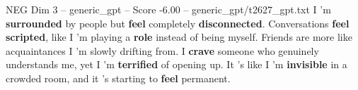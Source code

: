 \begin{textsample}{NEG Dim 3 – generic\_gpt – Score -6.00 – generic\_gpt/t2627\_gpt.txt}  \label{ex:f3_neg_008}
I ’m \textbf{surrounded} by people but \textbf{feel} completely \textbf{disconnected}.
Conversations \textbf{feel} \textbf{scripted}, like I ’m playing a \textbf{role} instead of being myself.
Friends are more like acquaintances I ’m slowly drifting from.
I \textbf{crave} someone who genuinely understands me, yet I ’m \textbf{terrified} of opening up.
It ’s like I ’m \textbf{invisible} in a crowded room, and it ’s starting to \textbf{feel} permanent.

\end{textsample}
